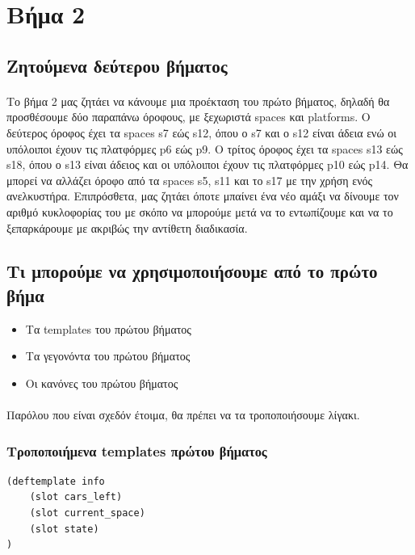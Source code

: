 \documentclass{article}
\begin{document}
    \section{Βήμα 2}
    \subsection{Ζητούμενα δεύτερου βήματος}
    \paragraph{}
    Το βήμα 2 μας ζητάει να κάνουμε μια προέκταση του πρώτο βήματος, δηλαδή θα προσθέσουμε δύο παραπάνω όροφους, με ξεχωριστά spaces και platforms.
    Ο δεύτερος όροφος έχει τα spaces s7 εώς s12, όπου ο s7 και ο s12 είναι άδεια ενώ οι υπόλοιποι έχουν τις πλατφόρμες p6 εώς p9.
    Ο τρίτος όροφος έχει τα spaces s13 εώς s18, όπου ο s13 είναι άδειος και οι υπόλοιποι έχουν τις πλατφόρμες p10 εώς p14.
    Θα μπορεί να αλλάζει όροφο από τα spaces s5, s11 και το s17 με την χρήση ενός ανελκυστήρα.
    Επιπρόσθετα, μας ζητάει όποτε μπαίνει ένα νέο αμάξι να δίνουμε τον αριθμό κυκλοφορίας του με σκόπο να μπορούμε μετά να το εντωπίζουμε
    και να το ξεπαρκάρουμε με ακριβώς την αντίθετη διαδικασία.

    \subsection{Τι μπορούμε να χρησιμοποιήσουμε από το πρώτο βήμα}

    \begin{itemize}
        \item Τα templates του πρώτου βήματος
        \item Τα γεγονόντα του πρώτου βήματος
        \item Οι κανόνες του πρώτου βήματος
    \end{itemize}

    \paragraph{}
    Παρόλου που είναι σχεδόν έτοιμα, θα πρέπει να τα τροποποιήσουμε λίγακι.

    \subsubsection{Τροποποιήμενα templates πρώτου βήματος}
    \begin{lstlisting}
(deftemplate info
    (slot cars_left)
    (slot current_space)
    (slot state)
)
    \end{lstlisting}
\end{document}
